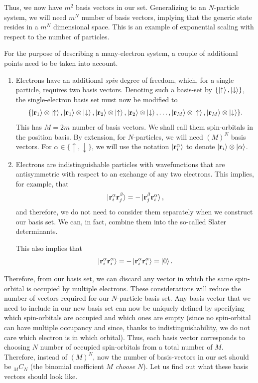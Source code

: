 \documentclass[12pt,oneside]{book}
\begin{document}
Thus, we now have $m^2$ basis vectors in our set. Generalizing to an $N$-particle system, we will need $m^N$ number of basis vectors, implying that the generic state resides in a $m^N$ dimensional space. This is an example of exponential scaling with respect to the number of particles.

For the purpose of describing a many-electron system, a couple of additional points need to be taken into account.
\begin{enumerate}
    \item Electrons have an additional \textit{spin} degree of freedom, which, for a single particle, requires two basis vectors. Denoting such a basis-set by $\{\ket{\uparrow},\ket{\downarrow}\}$, the single-electron basis set must now be modified to 
    \begin{align*}
        \{\ket{\mathbf{r}_1}\otimes\ket{\uparrow}, \ket{\mathbf{r}_1}\otimes\ket{\downarrow}, \ket{\mathbf{r}_2}\otimes\ket{\uparrow}, \ket{\mathbf{r}_2}\otimes\ket{\downarrow},\hdots, \ket{\mathbf{r}_M}\otimes\ket{\uparrow}, \ket{\mathbf{r}_M}\otimes\ket{\downarrow}\}.
    \end{align*}
    This has $M = 2m$ number of basis vectors.  We shall call them spin-orbitals in the position basis. By extension, for $N$-particles, we will need $(M)^N$ basis vectors. For $\alpha \in \{\uparrow,\downarrow\}$, we will use the notation $\ket{\mathbf{r}_i^\alpha}$ to denote $\ket{\mathbf{r}_i}\otimes\ket{\alpha}$.
    \item Electrons are indistinguishable particles with wavefunctions that are antisymmetric with respect to an exchange of any two electrons. This implies, for example, that
    \begin{align}
        \ket{\mathbf{r}_i^\alpha\mathbf{r}_j^\beta} = -\ket{\mathbf{r}_j^\beta\mathbf{r}_i^\alpha},
    \end{align}
    and therefore, we do not need to consider them separately when we construct our basis set. We can, in fact, combine them into the so-called Slater determinants.

    This also implies that
\begin{align}
\ket{\mathbf{r}_i^\alpha\mathbf{r}_i^\alpha}=-\ket{\mathbf{r}_i^\alpha\mathbf{r}_i^\alpha}=\ket{0}.
\end{align}

\end{enumerate}

Therefore, from our basis set, we can discard any vector in which the same spin-orbital is occupied by multiple electrons. These considerations will reduce the number of vectors required for our $N$-particle basis set. Any basis vector that we need to include in our new basis set can now be uniquely defined by specifying which spin-orbitals are occupied and which ones are empty (since no spin-orbital can have multiple occupancy and since, thanks to indistinguishability, we do not care which electron is in which orbital). Thus, each basis vector corresponds to choosing $N$ number of occupied spin-orbitals from a total number of $M$. Therefore, instead of $(M)^N$, now the number of basis-vectors in our set should be $_{M}C_N$ (the binomial coefficient \textit{$M$ choose $N$}). Let us find out what these basis vectors should look like.
\end{document}
